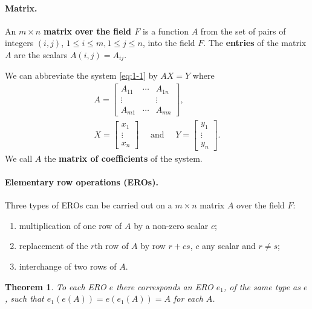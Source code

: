 \documentclass{article}
\newtheorem{theorem}{Theorem}
\begin{document}
\paragraph{Matrix.} An $m \times n$ \textbf{matrix over the field $F$} is a
function $A$ from the set of pairs of integers $(i, j)$, $1 \leq i \leq m, 1
\leq j \leq n$, into the field $F$. The \textbf{entries} of the matrix $A$ are
the scalars $A(i, j) = A_{ij}$.

We can abbreviate the system \eqref{eq:1-1} by $AX = Y$ where
\begin{gather*}
  A = \begin{bmatrix}
    A_{11} & \cdots & A_{1n} \\
    \vdots & & \vdots \\
    A_{m1} & \cdots & A_{mn}
  \end{bmatrix}, \\
  X = \begin{bmatrix}
    x_1 \\
    \vdots \\
    x_n
  \end{bmatrix}
  \quad\text{ and }\quad
  Y = \begin{bmatrix}
    y_1 \\
    \vdots \\
    y_n
  \end{bmatrix}.
\end{gather*}
We call $A$ the \textbf{matrix of coefficients} of the system.

\paragraph{Elementary row operations (EROs).} Three types of EROs can be carried
out on a $m \times n$ matrix $A$ over the field $F$:
\begin{enumerate}
  \item multiplication of one row of $A$ by a non-zero scalar $c$;
  \item replacement of the $r$th row of $A$ by row $r + cs$, $c$ any scalar and
    $r \neq s$;
  \item interchange of two rows of $A$.
\end{enumerate}

\begin{theorem}
  To each ERO $e$ there corresponds an ERO $e_1$, of the same type as $e$, such
  that $e_1(e(A)) = e(e_1(A)) = A$ for each $A$.
\end{theorem}
\end{document}
